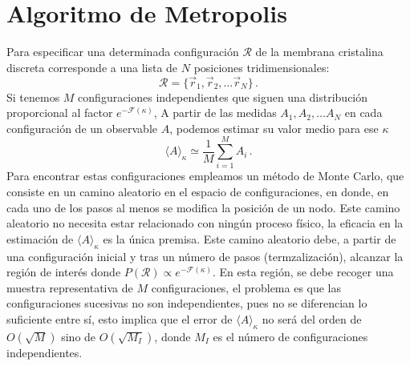 \section{Algoritmo de Metropolis}
Para especificar una determinada configuración $\mathcal{R}$ de la membrana
cristalina discreta corresponde a una lista de $N$ posiciones
tridimensionales:
\begin{equation}
\mathcal{R}=\{ \vec{r}_1,\vec{r}_2,\dots \vec{r}_N\}\,.
\end{equation}
Si tenemos $M$ configuraciones independientes que siguen una distribución
proporcional al factor $e^{-\mathcal{F}(\kappa)}$, A partir de las medidas
$A_1,A_2,\dots A_N$ en cada configuración de un observable $A$, podemos
estimar su valor medio para ese $\kappa$
\begin{equation}
\langle A \rangle_{\kappa}\simeq \frac{1}{M}\sum^M_{i=1} A_i\,.
\end{equation}
Para encontrar estas configuraciones empleamos un método de Monte Carlo, que
consiste en un camino aleatorio en el espacio de configuraciones, en donde, en
cada uno de los pasos al menos se modifica la posición de un nodo. Este camino
aleatorio no necesita estar relacionado con ningún proceso físico, la eficacia
en la estimación de $\langle A \rangle_{\kappa}$ es la única premisa. Este
camino aleatorio debe, a partir de una configuración inicial y tras un número
de pasos (termzalización), alcanzar la región de interés donde
$P(\mathcal{R})\propto e^{-\mathcal{F}(\kappa)}$. En esta región, se debe
recoger una muestra representativa de $M$ configuraciones, el problema es que
las configuraciones sucesivas no son independientes, pues no se
diferencian lo suficiente entre sí, esto implica que el error de $\langle A
\rangle_{\kappa}$ no será del orden de $O(\sqrt{M})$ sino de $O(\sqrt{M_I})$,
donde $M_I$ es el número de configuraciones independientes. 


